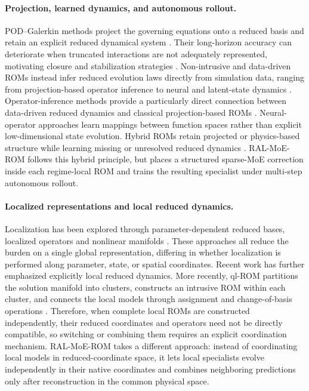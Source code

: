 \documentclass{article}
\begin{document}
\paragraph{Projection, learned dynamics, and autonomous rollout.}
POD--Galerkin methods project the governing equations onto a reduced basis and retain an explicit reduced dynamical system \citep{sirovich1987,berkooz1993,benner2015}. Their long-horizon accuracy can deteriorate when truncated interactions are not adequately represented, motivating closure and stabilization strategies
\citep{amsallem2012}. Non-intrusive and data-driven ROMs instead infer reduced evolution laws directly from simulation data, ranging from projection-based operator inference to neural and latent-state dynamics
\citep{peherstorfer2016,hesthaven2018,champion2019,lee2020, pan2024domain,park2024}. Operator-inference methods provide a particularly direct connection between data-driven reduced dynamics and classical projection-based ROMs \citep{peherstorfer2016}. Neural-operator approaches learn mappings between function spaces rather than explicit low-dimensional state evolution\citep{lu2021,kovachki2023}. Hybrid ROMs retain projected or physics-based structure while learning missing or unresolved reduced dynamics \citep{duraisamy2019,fresca2022,dar2023}. RAL-MoE-ROM follows this hybrid principle, but places a structured sparse-MoE correction inside each regime-local ROM and trains the resulting specialist under multi-step  autonomous rollout.



\paragraph{Localized representations and local reduced dynamics.}
Localization has been explored through parameter-dependent reduced bases, localized operators and nonlinear manifolds \citep{amsallem2008,peherstorfer2014,kaiser2014,li2021cluster,diaz2024,bhat2025}. These approaches all reduce the burden on a single global representation, differing in whether localization is performed along parameter, state, or spatial coordinates. Recent work has further emphasized explicitly local reduced dynamics. More recently, ql-ROM partitions the solution manifold into clusters, constructs an intrusive ROM within each cluster, and connects the local models through assignment and change-of-basis operations
\citep{colanera2025}. Therefore, when complete local ROMs are constructed independently, their reduced coordinates and operators need not be directly compatible, so switching or combining them requires an explicit coordination mechanism. RAL-MoE-ROM takes a different approach: instead of coordinating local models in reduced-coordinate space, it lets local specialists evolve independently in their native coordinates and combines neighboring predictions only after reconstruction in the common physical space.
\end{document}
